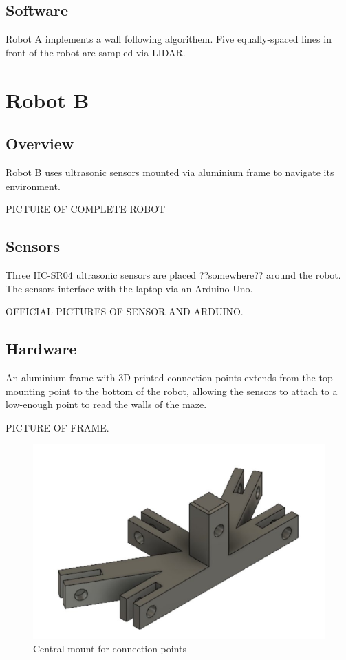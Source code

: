 \documentclass[11pt]{article}
\begin{document}
	\subsection{Software}	
	Robot A implements a wall following algorithem. Five equally-spaced lines in front of the robot are sampled via LIDAR.
	
	\pagebreak

	\section{Robot B}
	
	
	\subsection{Overview}
	Robot B uses ultrasonic sensors mounted via aluminium frame to navigate its environment.
	
	PICTURE OF COMPLETE ROBOT
	
	\subsection{Sensors}
	Three HC-SR04 ultrasonic sensors are placed ??somewhere?? around the robot. The sensors interface with the laptop via an Arduino Uno.
	
	OFFICIAL PICTURES OF SENSOR AND ARDUINO.
	
	\subsection{Hardware}
	An aluminium frame with 3D-printed connection points extends from the top mounting point to the bottom of the robot, allowing the sensors to attach to a low-enough point to read the walls of the maze.
	
	PICTURE OF FRAME.
	
	\begin{figure}[h]
		\centering
		\includegraphics[scale=0.5]{central_mount_empty}
		\caption{Central mount for connection points}
	\end{figure}
\end{document}

